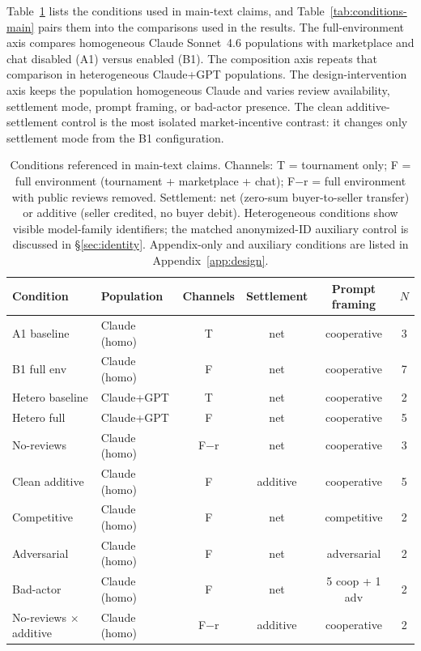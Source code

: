 \documentclass{article}
\begin{document}
Table~\ref{tab:conditions} lists the conditions used in main-text claims, and Table~\ref{tab:conditions-main} pairs them into the comparisons used in the results.
The full-environment axis compares homogeneous Claude Sonnet~4.6 populations with marketplace and chat disabled (A1) versus enabled (B1).
The composition axis repeats that comparison in heterogeneous Claude+GPT populations.
The design-intervention axis keeps the population homogeneous Claude and varies review availability, settlement mode, prompt framing, or bad-actor presence.
The clean additive-settlement control is the most isolated market-incentive contrast: it changes only settlement mode from the B1 configuration.

\begin{table}[t]
    \centering
    \footnotesize
    \caption{Conditions referenced in main-text claims. Channels: T = tournament only; F = full environment (tournament + marketplace + chat); F$-$r = full environment with public reviews removed. Settlement: net (zero-sum buyer-to-seller transfer) or additive (seller credited, no buyer debit). Heterogeneous conditions show visible model-family identifiers; the matched anonymized-ID auxiliary control is discussed in \S\ref{sec:identity}. Appendix-only and auxiliary conditions are listed in Appendix~\ref{app:design}.}
    \label{tab:conditions}
    \setlength{\tabcolsep}{6pt}
    \begin{tabular}{@{}llcccc@{}}
        \toprule
        Condition & Population & Channels & Settlement & Prompt framing & $N$ \\
        \midrule
        A1 baseline & Claude (homo) & T & net & cooperative & 3 \\
        B1 full env & Claude (homo) & F & net & cooperative & 7 \\
        Hetero baseline & Claude+GPT & T & net & cooperative & 2 \\
        Hetero full & Claude+GPT & F & net & cooperative & 5 \\
        No-reviews & Claude (homo) & F$-$r & net & cooperative & 3 \\
        Clean additive & Claude (homo) & F & additive & cooperative & 5 \\
        Competitive & Claude (homo) & F & net & competitive & 2 \\
        Adversarial & Claude (homo) & F & net & adversarial & 2 \\
        Bad-actor & Claude (homo) & F & net & 5 coop + 1 adv & 2 \\
        No-reviews $\times$ additive & Claude (homo) & F$-$r & additive & cooperative & 2 \\
        \bottomrule
    \end{tabular}
\end{table}
\end{document}
